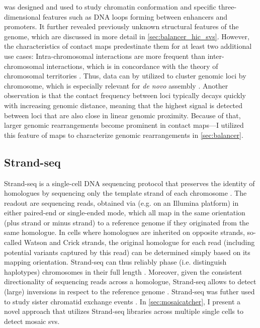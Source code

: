 \hic was designed and used to study chromatin conformation and specific
three-dimensional features such as DNA loops forming between enhancers and
promoters. It further revealed previously unknown structural features of the
genome, which are discussed in more detail in \cref{sec:balancer_hic_svs}.
However, the characteristics of \hic contact maps predestinate them for at least
two additional use cases: Intra-chromosomal interactions are more frequent than
inter-chromosomal interactions, which is in concordance with the theory of
chromosomal territories \citep{Cremer2001}. Thus, \hic data can by utilized to
cluster genomic loci by chromosome, which is especially relevant for \textit{de
novo} assembly \citep{Burton2013}. Another observation is that the contact
frequency between loci typically decays quickly with increasing genomic
distance, meaning that the highest signal is detected between loci that are also
close in linear genomic proximity. Because of that, larger genomic
rearrangements become prominent in contact maps---I utilized this feature of
\hic maps to characterize genomic rearrangements in \cref{sec:balancer}.





\subsection{Strand-seq}
\label{sec:strandseq}

Strand-seq is a single-cell DNA sequencing protocol that preserves the identity
of homologues by sequencing only the template strand of each chromosome
\citep{Falconer2012,Sanders2017}. The readout are sequencing reads, obtained via
\mps (e.g. on an Illumina platform) in either paired-end or single-ended mode,
which all map in the same orientation (plus strand or minus strand) to a
reference genome if they originated from the same homologue. In cells where
homologues are inherited on opposite strands, so-called Watson and Crick
strands, the original homologue for each read (including potential variants
captured by this read) can be determined simply based
on its mapping orientation. Strand-seq can thus reliably phase (i.e. distinguish
haplotypes) chromosomes in their full length \citep{Porubsky2016}. Moreover,
given the consistent directionality of sequencing reads across a homologue,
Strand-seq allows to detect (large) inversions in respect to the reference
genome \citep{Sanders2016}.
Strand-seq was futher used to study sister chromatid exchange events
\citep{Falconer2012}. In \cref{sec:mosaicatcher}, I present a novel approach
that utilizes Strand-seq libraries across multiple single cells to detect mosaic
\acp{sv}.


